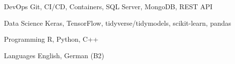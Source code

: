 

\begin{cvskills}

  \cvskill
    {DevOps} %
    {Git, CI/CD, Containers, SQL Server, MongoDB, REST API} %
    
  \cvskill
    {Data Science} %
    {Keras, TensorFlow, tidyverse/tidymodels, scikit-learn, pandas} %

  \cvskill
    {Programming} %
    {R, Python, C++} %

  \cvskill
    {Languages} %
    {English, German (B2)} %

\end{cvskills}
